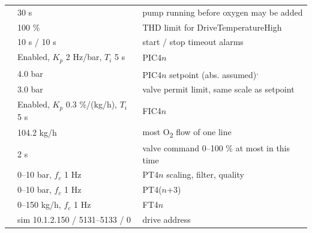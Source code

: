 \documentclass[11pt,a4paper]{article}
\newcommand{\Otwo}{O\textsubscript{2}}
\begin{document}
\begin{small}
\begin{longtable}{@{}P{62mm}P{30mm}P{62mm}@{}}
 & 30 s & pump running before oxygen may be added \\
 & 100 \% & THD limit for DriveTemperatureHigh \\
 & 10 s / 10 s & start / stop timeout alarms \\
 & Enabled, $K_p$ 2 Hz/bar, $T_i$ 5 s & PIC4$n$ \\
 & 4.0 bar & PIC4$n$ setpoint (abs. assumed)\textsuperscript{,} \\
 & 3.0 bar & valve permit limit, same scale as setpoint \\
 & Enabled, $K_p$ 0.3 \%/(kg/h), $T_i$ 5 s & FIC4$n$ \\
 & 104.2 kg/h & most \Otwo{} flow of one line \\
 & 2 s & valve command 0--100 \% at most in this time \\
 & 0--10 bar, $f_c$ 1 Hz & PT4$n$ scaling, filter, quality \\
 & 0--10 bar, $f_c$ 1 Hz & PT4($n$+3) \\
 & 0--150 kg/h, $f_c$ 1 Hz & FT4$n$ \\
 & sim 10.1.2.150 / 5131--5133 / 0 & drive address \\
\end{longtable}
\end{small}
\end{document}
